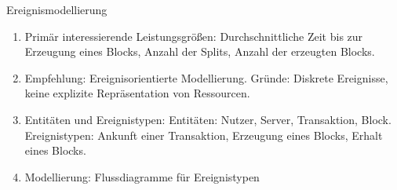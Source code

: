 \documentclass{article}
\begin{document}
\begin{exercise}{Ereignismodellierung}
  \begin{solution}
    \begin{enumerate}
      \item Primär interessierende Leistungsgrößen: Durchschnittliche Zeit bis zur Erzeugung eines Blocks, Anzahl der Splits, Anzahl der erzeugten Blocks.
      \item Empfehlung: Ereignisorientierte Modellierung. Gründe: Diskrete Ereignisse, keine explizite Repräsentation von Ressourcen.
      \item Entitäten und Ereignistypen: Entitäten: Nutzer, Server, Transaktion, Block. Ereignistypen: Ankunft einer Transaktion, Erzeugung eines Blocks, Erhalt eines Blocks.
      \item Modellierung: Flussdiagramme für Ereignistypen
    \end{enumerate}
  \end{solution}
\end{exercise}
\end{document}
